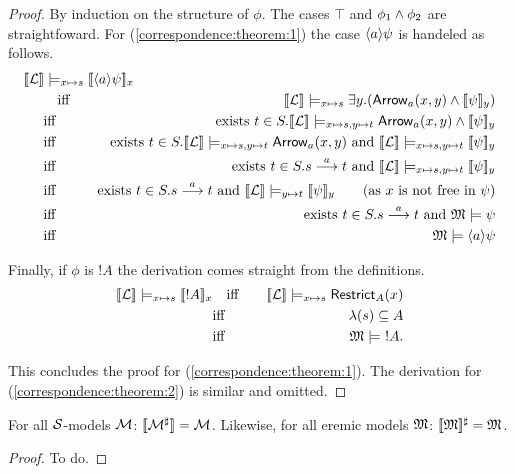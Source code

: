 \begin{proof}
By induction on the structure of $\phi$. The cases $\top$ and $\phi_1
\land \phi_2$ are straightfoward. For (\ref{correspondence:theorem:1})
the case $\langle a \rangle \psi$ is handeled as follows.
\begin{eqnarray*}
  \lefteqn{
  \SEMB{\LLL} \models_{x \mapsto s} \SEMB{\MAY{a}\psi}_x}\hspace{5mm} 
     \\
     &\quad \text{iff}\quad &
  \SEMB{\LLL} \models_{x \mapsto s} \exists y.(\ARROW{a}{x}{y} \AND \SEMB{\psi}_y) 
     \\
     &\text{iff}&
  \text{exists}\ t \in S. \SEMB{\LLL} \models_{x \mapsto s, y \mapsto t} \ARROW{a}{x}{y} \AND \SEMB{\psi}_y
     \\
     &\text{iff}&
  \text{exists}\ t \in S. \SEMB{\LLL} \models_{x \mapsto s, y \mapsto t} \ARROW{a}{x}{y} \ \text{and}\ \SEMB{\LLL} \models_{x \mapsto s, y \mapsto t}  \SEMB{\psi}_y
     \\
     &\text{iff}&
  \text{exists}\ t \in S. s \TRANS{a} t \ \text{and}\ \SEMB{\LLL} \models_{x \mapsto s, y \mapsto t}  \SEMB{\psi}_y
     \\
     &\text{iff}&
  \text{exists}\ t \in S. s \TRANS{a} t \ \text{and}\ \SEMB{\LLL} \models_{y \mapsto t}  \SEMB{\psi}_y \qquad (\text{as $x$ is not free in $\psi$})
     \\
     &\text{iff}&
  \text{exists}\ t \in S. s \TRANS{a} t \ \text{and}\ \MMM \models \psi
     \\
     &\text{iff}&
  \MMM \models \MAY{a}\psi  
\end{eqnarray*}

\NI Finally, if $\phi$ is $!A$ the derivation comes straight from the definitions.
\begin{eqnarray*}
  \lbrack\!\lbrack \mathcal{L} \rbrack\!\rbrack \models_{x \mapsto s} \lbrack\!\lbrack !A \rbrack\!\rbrack_x
    &\quad \text{iff}\quad &
  \lbrack\!\lbrack \mathcal{L} \rbrack\!\rbrack \models_{x \mapsto s} \mathsf{Restrict}_{A}(x)
     \\
     &\text{iff}&
  \lambda(s) \subseteq A
     \\
     &\text{iff}&
  \frak{M} \models\ !A.
\end{eqnarray*}

\NI This concludes the proof for (\ref{correspondence:theorem:1}).
The derivation for (\ref{correspondence:theorem:2}) is similar and
omitted.
\end{proof}


\begin{lemma}\label{modelIso:lemma}
For all $\mathcal{S}$-models $\mathcal{M}$: $\lbrack\!\lbrack \mathcal{M}^{\sharp} \rbrack\!\rbrack = \mathcal{M}$.
Likewise, for all eremic models $\frak{M}$: 
 $\lbrack\!\lbrack \frak{M} \rbrack\!\rbrack^{\sharp} = \frak{M}$.
\end{lemma}
\begin{proof}
To do.
\end{proof}

